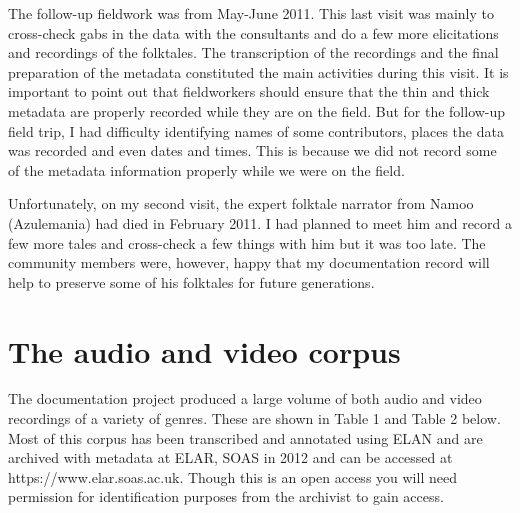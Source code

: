 \documentclass[output=paper,colorlinks,citecolor=brown]{langscibook}
\begin{document}
The follow-up fieldwork was from May-June 2011. This last visit was mainly to cross-check gabs in the data with the consultants and do a few more elicitations and recordings of the folktales. The transcription of the recordings and the final preparation of the metadata constituted the main activities during this visit. It is important to point out that fieldworkers should ensure that the thin and thick metadata are properly recorded while they are on the field. But for the follow-up field trip, I had difficulty identifying names of some contributors, places the data was recorded and even dates and times. This is because we did not record some of the metadata information properly while we were on the field.

Unfortunately, on my second visit, the expert folktale narrator from Namoo (Azulemania) had died in February 2011. I had planned to meet him and record a few more tales and cross-check a few things with him but it was too late. The community members were, however, happy that my documentation record will help to preserve some of his folktales for future generations.


\section{The audio and video corpus}
The documentation project produced a large volume of both audio and video recordings of a variety of genres. These are shown in Table 1 and Table 2 below. Most of this corpus has been transcribed and annotated using ELAN and are archived with metadata at ELAR, SOAS in 2012 and can be accessed at    https://www.elar.soas.ac.uk. Though this is an open access you will need permission for identification purposes from the archivist to gain access.
\end{document}
